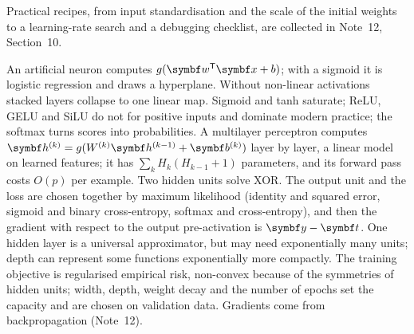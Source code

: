 \documentclass[11pt]{article}
\newcommand{\w}{\vect{w}}
\newcommand{\hv}{\vect{h}}
\newcommand{\y}{\vect{y}}
\newcommand{\vt}{\vect{t}}
\newcommand{\vb}{\vect{b}}
\begin{document}
Practical recipes, from input standardisation and the scale of the initial weights to a learning-rate search and a
debugging checklist, are collected in Note~12, Section~10.

\begin{keyidea}[Summary]
An artificial neuron computes $g(\w\T\x + b)$; with a sigmoid it is logistic regression and draws a hyperplane. Without
non-linear activations stacked layers collapse to one linear map. Sigmoid and tanh saturate; ReLU, GELU and SiLU do not
for positive inputs and dominate modern practice; the softmax turns scores into probabilities. A multilayer perceptron
computes $\hv^{(k)} = g(W^{(k)}\hv^{(k-1)} + \vb^{(k)})$ layer by layer, a linear model on learned features; it has
$\sum_k H_k(H_{k-1} + 1)$ parameters, and its forward pass costs $O(p)$ per example. Two hidden units solve XOR. The
output unit and the loss are chosen together by maximum likelihood (identity and squared error, sigmoid and binary
cross-entropy, softmax and cross-entropy), and then the gradient with respect to the output pre-activation is $\y - \vt$.
One hidden layer is a universal approximator, but may need exponentially many units; depth can represent some
functions exponentially more compactly. The training objective is regularised empirical risk, non-convex because of the
symmetries of hidden units; width, depth, weight decay and the number of epochs set the capacity and are chosen on
validation data. Gradients come from backpropagation (Note~12).
\end{keyidea}
\end{document}
